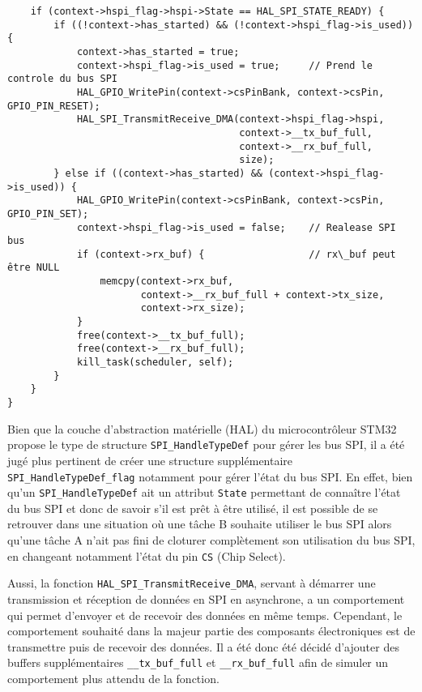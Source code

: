 \begin{lstlisting}
    if (context->hspi_flag->hspi->State == HAL_SPI_STATE_READY) {
        if ((!context->has_started) && (!context->hspi_flag->is_used)) {
            context->has_started = true;
            context->hspi_flag->is_used = true;     // Prend le controle du bus SPI
            HAL_GPIO_WritePin(context->csPinBank, context->csPin, GPIO_PIN_RESET);
            HAL_SPI_TransmitReceive_DMA(context->hspi_flag->hspi,
                                        context->__tx_buf_full,
                                        context->__rx_buf_full,
                                        size);
        } else if ((context->has_started) && (context->hspi_flag->is_used)) {
            HAL_GPIO_WritePin(context->csPinBank, context->csPin, GPIO_PIN_SET);
            context->hspi_flag->is_used = false;    // Realease SPI bus
            if (context->rx_buf) {                  // rx\_buf peut être NULL
                memcpy(context->rx_buf,
                       context->__rx_buf_full + context->tx_size,
                       context->rx_size);
            }
            free(context->__tx_buf_full);
            free(context->__rx_buf_full);
            kill_task(scheduler, self);
        }
    }
}

\end{lstlisting}

Bien que la couche d'abstraction matérielle (HAL) du microcontrôleur STM32 propose
le type de structure \texttt{SPI\_HandleTypeDef} pour gérer les bus SPI, il a été
jugé plus pertinent de créer une structure supplémentaire
\texttt{SPI\_HandleTypeDef\_flag} notamment pour gérer l'état du bus SPI. En effet,
bien qu'un \texttt{SPI\_HandleTypeDef} ait un attribut \texttt{State} permettant de
connaître l'état du bus SPI et donc de savoir s'il est prêt à être utilisé, il est
possible de se retrouver dans une situation où une tâche B souhaite utiliser le bus
SPI alors qu'une tâche A n'ait pas fini de cloturer complètement son utilisation du
bus SPI, en changeant notamment l'état du pin \texttt{CS} (Chip Select).

Aussi, la fonction \texttt{HAL\_SPI\_TransmitReceive\_DMA}, servant à démarrer une
transmission et réception de données en SPI en asynchrone, a un comportement qui
permet d'envoyer et de recevoir des données en même temps. Cependant, le
comportement souhaité dans la majeur partie des composants électroniques est de
transmettre puis de recevoir des données. Il a été donc été décidé d'ajouter des
buffers supplémentaires \texttt{\_\_tx\_buf\_full} et \texttt{\_\_rx\_buf\_full}
afin de simuler un comportement plus attendu de la fonction.\\

